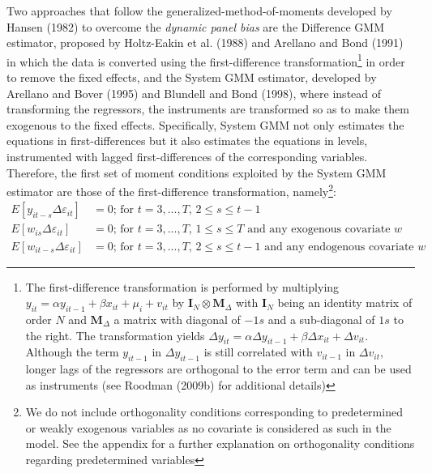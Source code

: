 \documentclass[12pt,a4paper,english]{article}%
\begin{document}
Two approaches that follow the generalized-method-of-moments developed by Hansen (1982) to overcome the \emph{dynamic panel bias} are the Difference GMM estimator, proposed by Holtz-Eakin et al. (1988) and Arellano and Bond (1991) in which the data is converted using the first-difference transformation\footnote{The first-difference transformation is performed by multiplying $y_{it}=\alpha y_{it-1} + \beta x_{it} + \mu_i+v_{it}$ by $\mathbf{I}_N \otimes \mathbf{M}_{\Delta}$ with $\mathbf{I}_N$ being an identity matrix of order $N$ and $\mathbf{M}_{\Delta}$ a matrix with diagonal of $-1s$ and a sub-diagonal of $1s$ to the right. The transformation yields $\Delta y_{it}=\alpha \Delta y_{it-1} + \beta \Delta x_{it} +\Delta v_{it}$. Although the term $y_{it-1}$ in $\Delta y_{it-1}$ is still correlated with $v_{it-1}$ in $\Delta v_{it}$, longer lags of the regressors are orthogonal to the error term and can be used as instruments (see Roodman (2009b) for additional details)} in order to remove the fixed effects, and the System GMM estimator, developed by Arellano and Bover (1995) and Blundell and Bond (1998), where instead of transforming the regressors, the instruments are transformed so as to make them exogenous to the fixed effects. Specifically, System GMM not only estimates the equations in first-differences but it also estimates the equations in levels, instrumented with lagged first-differences of the corresponding variables. Therefore, the first set of moment conditions exploited by the System GMM estimator are those of the first-difference transformation, namely\footnote{We do not include orthogonality conditions corresponding to predetermined or weakly exogenous variables as no covariate is considered as such in the model. See the appendix for a further explanation on orthogonality conditions regarding predetermined variables}:
\begin{equation}
\label{momentsDiff}
\begin{aligned}
E\left[ y_{it-s}\Delta \varepsilon_{it}\right]&=0 \text{; for $t=3,...,T$, $2\leq s \leq t-1$}\\
E\left[w_{is}\Delta \varepsilon_{it}\right]&=0 \text{; for $t=3,...,T$, $1\leq s \leq T$ and any exogenous covariate $w$}\\
E\left[w_{it-s}\Delta \varepsilon_{it}\right]&=0 \text{; for $t=3,...,T$, $2\leq s \leq t-1$ and any endogenous covariate $w$}
\end{aligned}
\end{equation}
\end{document}
